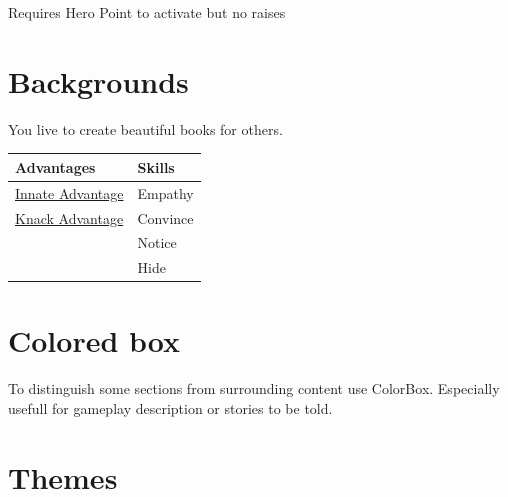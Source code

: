     \hypertarget{a:knackadvantage}{}
    Requires Hero Point to activate but no raises
    
    \newpage
    \section{Backgrounds}
    \noindent You live to create beautiful books for others.
    

    
    \begin{table}[h]
        \centering
        \renewcommand{\arraystretch}{1.2} %
        \begin{tabular}{p{} p{}} %
            \textbf{Advantages} & \textbf{Skills} \\
            \hline
            \hyperlink{a:innateadvantage}{Innate Advantage} & Empathy \\
            \hyperlink{a:knackadvantage}{Knack Advantage} & Convince \\
            & Notice \\
            & Hide \\
            \hline
        \end{tabular}
    \end{table}
    


	\section{Colored box}
    \begin{ColorBox}{
    	To distinguish some sections from surrounding content use ColorBox. Especially usefull for gameplay description or stories to be told.
    }
    \end{ColorBox}
    
    \section{Themes}
    








    

        

